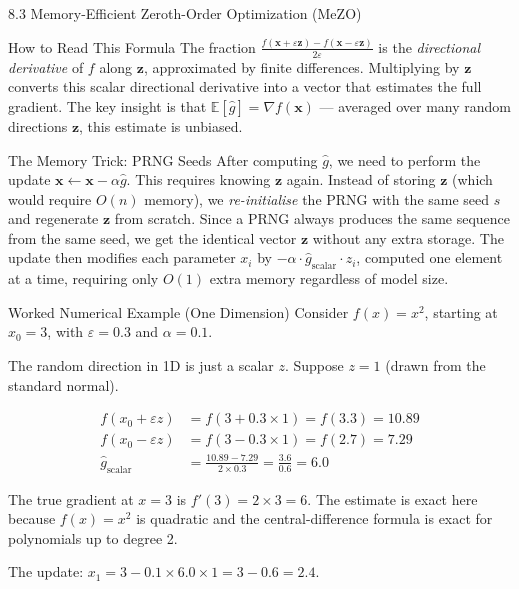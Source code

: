 \documentclass[aspectratio=169,10pt]{beamer}
\begin{document}
\begin{frame}[allowframebreaks]{8.3 Memory-Efficient Zeroth-Order Optimization (MeZO)}
\begin{alertblock}{How to Read This Formula}
The fraction $\frac{f(\mathbf{x} + \varepsilon\mathbf{z}) - f(\mathbf{x} - \varepsilon\mathbf{z})}{2\varepsilon}$ is the \emph{directional derivative} of $f$ along $\mathbf{z}$, approximated by finite differences. Multiplying by $\mathbf{z}$ converts this scalar directional derivative into a vector that estimates the full gradient. The key insight is that $\mathbb{E}[\hat{g}] = \nabla f(\mathbf{x})$ --- averaged over many random directions $\mathbf{z}$, this estimate is unbiased.
\end{alertblock}

\begin{block}{The Memory Trick: PRNG Seeds}
After computing $\hat{g}$, we need to perform the update $\mathbf{x} \leftarrow \mathbf{x} - \alpha \hat{g}$.
This requires knowing $\mathbf{z}$ again.
Instead of storing $\mathbf{z}$ (which would require $O(n)$ memory), we \emph{re-initialise} the PRNG with the same seed $s$ and regenerate $\mathbf{z}$ from scratch.
Since a PRNG always produces the same sequence from the same seed, we get the identical vector $\mathbf{z}$ without any extra storage.
The update then modifies each parameter $x_i$ by $-\alpha \cdot \hat{g}_\text{scalar} \cdot z_i$, computed one element at a time, requiring only $O(1)$ extra memory regardless of model size.
\end{block}

\begin{exampleblock}{Worked Numerical Example (One Dimension)}
Consider $f(x) = x^2$, starting at $x_0 = 3$, with $\varepsilon = 0.3$ and $\alpha = 0.1$.

The random direction in 1D is just a scalar $z$. Suppose $z = 1$ (drawn from the standard normal).

\begin{align*}
  f(x_0 + \varepsilon z) &= f(3 + 0.3 \times 1) = f(3.3) = 10.89 \\
  f(x_0 - \varepsilon z) &= f(3 - 0.3 \times 1) = f(2.7) = 7.29 \\
  \hat{g}_\text{scalar} &= \frac{10.89 - 7.29}{2 \times 0.3} = \frac{3.6}{0.6} = 6.0
\end{align*}

The true gradient at $x = 3$ is $f'(3) = 2 \times 3 = 6$. The estimate is exact here because $f(x) = x^2$ is quadratic and the central-difference formula is exact for polynomials up to degree 2.

The update: $x_1 = 3 - 0.1 \times 6.0 \times 1 = 3 - 0.6 = 2.4$.
\end{exampleblock}


\end{frame}
\end{document}
